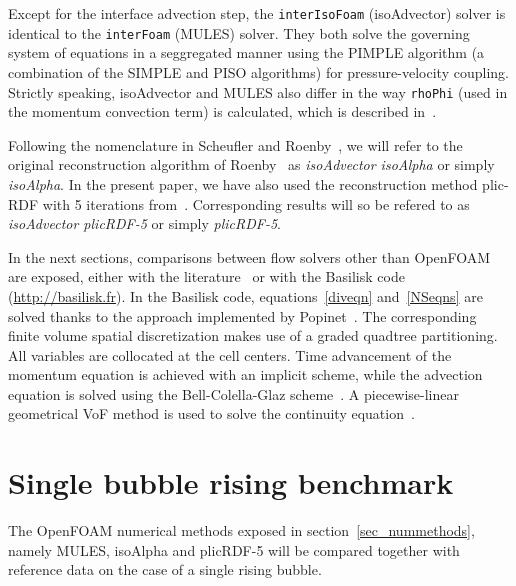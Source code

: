 \documentclass[review]{elsarticle}
\begin{document}
Except for the interface advection step, the \verb+interIsoFoam+ (isoAdvector) solver is identical to the \verb+interFoam+ (MULES) solver. They both solve the governing system of equations in a seggregated manner using the PIMPLE algorithm (a combination of the SIMPLE and PISO algorithms) for pressure-velocity coupling. Strictly speaking, isoAdvector and MULES also differ in the way \verb+rhoPhi+ (used in the momentum convection term) is calculated, which is described in~\cite{roenby_isoadvector:_2018}.

Following the nomenclature in Scheufler and Roenby~\cite{Scheufler2018}, we will refer to the original reconstruction algorithm of Roenby~\cite{Roenby160405} as {\em{isoAdvector isoAlpha}} or simply {\em{isoAlpha}}. In the present paper, we have also used the reconstruction method plic-RDF with 5 iterations from~\cite{Scheufler2018}. Corresponding results will so be refered to as {\em{isoAdvector plicRDF-5}} or simply {\em{plicRDF-5}}.

In the next sections, comparisons between flow solvers other than OpenFOAM are exposed, either with the literature~\cite{Hysing2009} or with the Basilisk code (\url{http://basilisk.fr}). In the Basilisk code, equations~\ref{diveqn} and~\ref{NSeqns} are solved thanks to the approach implemented by Popinet~\citep{popinet2015}. The corresponding finite volume spatial discretization makes use of a graded quadtree partitioning. All variables are collocated at the cell centers. Time advancement of the momentum equation is achieved with an implicit scheme, while the advection equation is solved using the Bell-Colella-Glaz scheme~\cite{bell1989}. A piecewise-linear geometrical VoF method is used to solve the continuity equation~\cite{popinet2009}.

\section{Single bubble rising benchmark}\label{sec_hysingcase}

The OpenFOAM numerical methods exposed in section~\ref{sec_nummethods}, namely MULES, isoAlpha and plicRDF-5 will be compared together with reference data on the case of a single rising bubble. 
\end{document}
